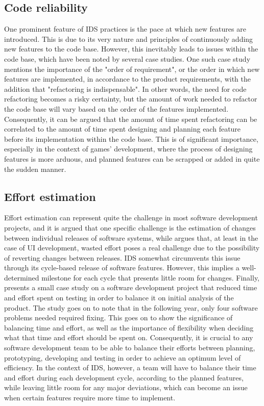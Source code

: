 \documentclass{scrartcl}
\begin{document}
    \subsection{Code reliability}
        
    One prominent feature of IDS practices is the pace at which new features are introduced. This is due to its very nature and principles of continuously adding new features to the code base. However, this inevitably leads to issues within the code base, which have been noted by several case studies. One such case study\cite{Source3} mentions the importance of the "order of requirement", or the order in which new features are implemented, in accordance to the product requirements, with the addition that "refactoring is indispensable". In other words, the need for code refactoring becomes a risky\cite{fowler_refactoring:_2018} certainty, but the amount of work needed to refactor the code base will vary based on the order of the features implemented. Consequently, it can be argued that the amount of time spent refactoring can be correlated to the amount of time spent designing and planning each feature before its implementation within the code base. This is of significant importance, especially in the context of games' development, where the process of designing features is more arduous, and planned features can be scrapped or added in quite the sudden manner.
    
    \subsection{Effort estimation}
    
    Effort estimation can represent quite the challenge in most software development projects, and it is argued that one specific challenge is the estimation of changes between individual releases of software systems\cite{Source4}, while \cite{Source8} argues that, at least in the case of UI development, wasted effort poses a real challenge due to the possibility of reverting changes between releases. IDS somewhat circumvents this issue through its cycle-based release of software features. However, this implies a well-determined milestone for each cycle that presents little room for changes. Finally, \cite{Source9} presents a small case study on a software development project that reduced time and effort spent on testing in order to balance it on initial analysis of the product. The study goes on to note that in the following year, only four software problems needed required fixing. This goes on to show the significance of balancing time and effort, as well as the importance of flexibility when deciding what that time and effort should be spent on. Consequently, it is crucial to any software development team to be able to balance their efforts between planning, prototyping, developing and testing in order to achieve an optimum level of efficiency. In the context of IDS, however, a team will have to balance their time and effort during each development cycle, according to the planned features, while leaving little room for any major deviations, which can become an issue when certain features require more time to implement.
    
\end{document}

